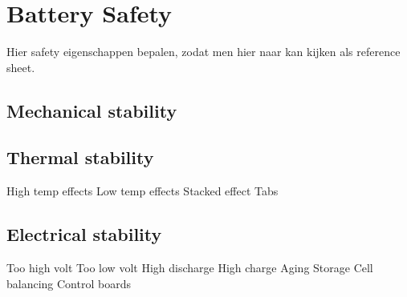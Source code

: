 \section{Battery Safety}
\label{Chap:Battery_Safety}
Hier safety eigenschappen bepalen, zodat men hier naar kan kijken als reference sheet.
\subsection{Mechanical stability}


\subsection{Thermal stability}
\label{Sub:Thermal_Stability}
High temp effects
Low temp effects
Stacked effect
Tabs


\subsection{Electrical stability}
\label{Sub:Electrical_Stability}
Too high volt
Too low volt
High discharge
High charge
Aging
Storage
Cell balancing
Control boards


\newpage